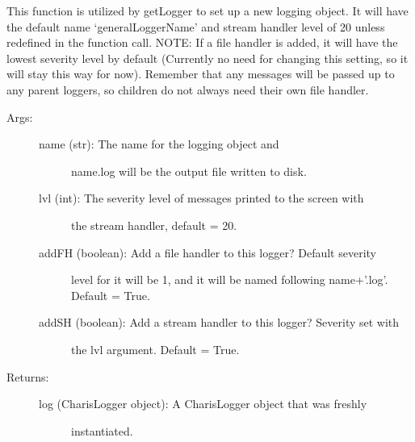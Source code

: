\documentclass[letterpaper,10pt,english]{sphinxmanual}
\begin{document}

\begin{fulllineitems}
\label{tools:tools.initLogger.setUpLogger}
This function is utilized by getLogger to set up a new logging object.
It will have the default name `generalLoggerName' and stream handler level
of 20 unless redefined in the function call.  
NOTE:
If a file handler is added, it will have the lowest severity level by 
default (Currently no need for changing this setting, so it will stay 
this way for now).  Remember that any messages will be passed up to any 
parent loggers, so children do not always need their own file handler.
\begin{description}
\item[{Args:}] \leavevmode\begin{description}
\item[{name (str): The name for the logging object and }] \leavevmode
name.log will be the output file written to disk.

\item[{lvl (int): The severity level of messages printed to the screen with }] \leavevmode
the stream handler, default = 20.

\item[{addFH (boolean): Add a file handler to this logger?  Default severity }] \leavevmode
level for it will be 1, and it will be named following
name+'.log'.  Default = True.

\item[{addSH (boolean): Add a stream handler to this logger? Severity set with }] \leavevmode
the lvl argument.  Default = True.

\end{description}

\item[{Returns:}] \leavevmode\begin{description}
\item[{log (CharisLogger object): A CharisLogger object that was freshly }] \leavevmode
instantiated.

\end{description}

\end{description}

\end{fulllineitems}
\end{document}
